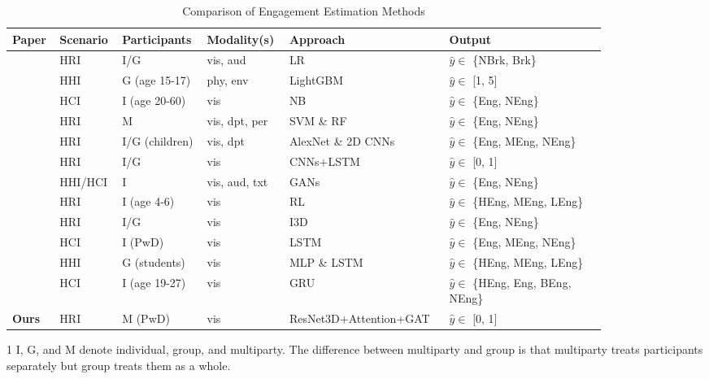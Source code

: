 \documentclass[twocolumn]{svjour3}
\begin{document}
\begin{table}[htb!]
  \centering
  \caption{Comparison of Engagement Estimation Methods}
  \label{t:references}
  \begin{threeparttable}[b]
  \begin{tabular}{p{0.06\linewidth}p{0.08\linewidth}p{0.12\linewidth}p{0.11\linewidth}p{0.23\linewidth}p{0.25\linewidth}}
  \toprule
  \textbf{Paper} & \textbf{Scenario} & \textbf{Participants}\tnote{1} & \textbf{Modality(s)}\tnote{2} & \textbf{Approach} \tnote{3} & \textbf{Output}\tnote{4} \\
  \midrule
  \cite{BenYoussef2019Early} & HRI & I/G & vis, aud & LR & $\hat{y} \in$ \{NBrk, Brk\} \\
  \cite{Gao2020NGage} & HHI & G (age 15-17) & phy, env & LightGBM & $\hat{y} \in$ [1, 5] \\
  \cite{Monkaresi2017Automated} & HCI & I (age 20-60) & vis & NB & $\hat{y} \in$ \{Eng, NEng\} \\
  \cite{Salam2017Fully} & HRI & M & vis, dpt, per & SVM \& RF & $\hat{y} \in$ \{Eng, NEng\} \\
  \midrule
  \cite{Anagnostopoulou2021Engagement} & HRI & I/G (children) & vis, dpt & AlexNet \& 2D CNNs & $\hat{y} \in$ \{Eng, MEng, NEng\} \\
  \cite{DelDuchetto2020Are} & HRI & I/G & vis & CNNs+LSTM & $\hat{y} \in$ [0, 1] \\
  \cite{Guhan2020ABCNet} & HHI/HCI & I & vis, aud, txt & GANs & $\hat{y} \in$ \{Eng, NEng\} \\
  \cite{Rudovic2019Personalized} & HRI & I (age 4-6) & vis & RL & $\hat{y} \in$ \{HEng, MEng, LEng\} \\
  \cite{Saleh2021Improving} & HRI & I/G & vis & I3D & $\hat{y} \in$ \{Eng, NEng\} \\
  \cite{Steinert2020Engagement} & HCI & I (PwD) & vis & LSTM & $\hat{y} \in$ \{Eng, MEng, NEng\} \\
  \cite{Sumer2021Multimodal} & HHI & G (students) & vis & MLP \& LSTM & $\hat{y} \in$ \{HEng, MEng, LEng\} \\
  \cite{Zhu2020Multirate} & HCI &
  I (age 19-27) & vis & GRU & $\hat{y} \in$ \{HEng, Eng, BEng, NEng\} \\
  \midrule
  \textbf{Ours} & HRI & M (PwD) & vis & ResNet3D+Attention+GAT & $\hat{y} \in$ [0, 1] \\
  \bottomrule
  \end{tabular}
  \begin{tablenotes}
    \item [1] I, G, and M denote individual, group, and multiparty. The difference between multiparty and group is that multiparty treats participants separately but group treats them as a whole.

\end{tablenotes}
\end{threeparttable}
\end{table}
\end{document}
